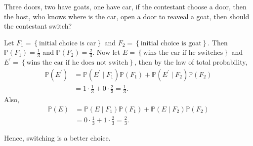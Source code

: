 \begin{eg}
    Three doors, two have goats, one have car, if the contestant choose a door, then the host, who knows where is the car, open a door to reaveal a goat, then should the contestant switch? 
\end{eg}

\begin{explanation}
    Let \(F_1 = \left\{ \text{initial choice is car}  \right\} \) and \(F_2 = \left\{ \text{initial choice is goat}  \right\} \). Then \(\mathbb{P} (F_1) = \frac{1}{3}\) and \(\mathbb{P} (F_2) = \frac{2}{3}\). Now let \(E = \left\{ \text{wins the car if he switches}  \right\} \) and \(E^{\prime} = \left\{ \text{wins the car if he does not switch}  \right\} \), then by the law of total probability,
    \begin{align*}
        \mathbb{P} (E^{\prime} ) &= \mathbb{P} (E^{\prime} \mid F_1) \mathbb{P} (F_1) + \mathbb{P} (E^{\prime} \mid F_2) \mathbb{P} (F_2) \\
        &= 1 \cdot \frac{1}{3} + 0 \cdot \frac{2}{3} = \frac{1}{3}.
    \end{align*}       
    Also,
    \begin{align*}
        \mathbb{P} (E) &= \mathbb{P} (E \mid F_1) \mathbb{P} (F_1) + \mathbb{P} (E \mid F_2) \mathbb{P} (F_2) \\
        &= 0 \cdot \frac{1}{3} + 1 \cdot \frac{2}{3} = \frac{2}{3}.
    \end{align*}

    Hence, switching is a better choice.
\end{explanation}

